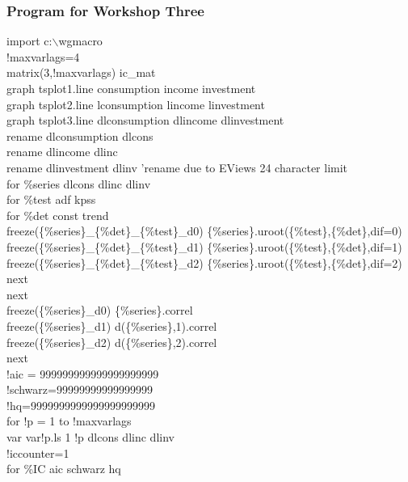 \documentclass[a4paper,10pt]{article}
\begin{document}
\subsubsection*{Program for Workshop Three}
import c:$\backslash$wgmacro\\
!maxvarlags=4\\
matrix(3,!maxvarlags) ic\_mat\\
graph tsplot1.line consumption income investment\\
graph tsplot2.line lconsumption lincome linvestment\\
graph tsplot3.line dlconsumption dlincome dlinvestment\\
rename dlconsumption dlcons\\
rename dlincome dlinc\\
rename dlinvestment dlinv 'rename due to EViews 24 character limit\\
for \%series dlcons dlinc dlinv\\	
\indent	for \%test adf kpss\\
\indent \indent		for \%det const trend\\
\indent \indent \indent		freeze(\{\%series\}\_\{\%det\}\_\{\%test\}\_d0)	\{\%series\}.uroot(\{\%test\},\{\%det\},dif=0)\\
\indent \indent \indent		freeze(\{\%series\}\_\{\%det\}\_\{\%test\}\_d1)	\{\%series\}.uroot(\{\%test\},\{\%det\},dif=1)\\
\indent \indent \indent		freeze(\{\%series\}\_\{\%det\}\_\{\%test\}\_d2)	\{\%series\}.uroot(\{\%test\},\{\%det\},dif=2)\\
\indent \indent		next\\
\indent	next\\
\indent	freeze(\{\%series\}\_d0) \{\%series\}.correl\\
\indent	freeze(\{\%series\}\_d1) d(\{\%series\},1).correl\\
\indent	freeze(\{\%series\}\_d2) d(\{\%series\},2).correl\\
next\\
!aic = 999999999999999999999\\
!schwarz=99999999999999999\\
!hq=9999999999999999999999\\
for !p = 1 to !maxvarlags	\\
\indent	var var{!p}.ls 1 !p dlcons dlinc dlinv\\
\indent	!iccounter=1\\
\indent	for \%IC aic schwarz hq\\
\end{document}
